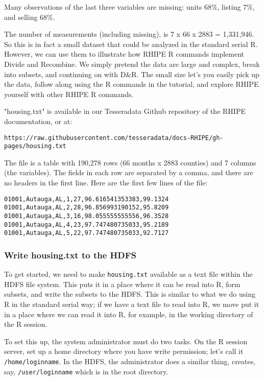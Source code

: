 Many observations of the last three variables are missing: units 68\%, listing
7\%, and selling 68\%.
 
The number of measurements (including missing), is 7 x 66 x 2883 = 1,331,946.
So this is in fact a small dataset that could be analyzed in the standard
serial R. However, we can use them to illustrate how RHIPE R commands implement
Divide and Recombine. We simply pretend the data are large and complex, break
into subsets, and continuing on with D\&R. The small size let's you easily
pick up the data, follow along using the R commands in the tutorial, and
explore RHIPE yourself with other RHIPE R commands.

"housing.txt" is available in our Tesseradata Github repository of the
RHIPE documentation, or at:
\begin{verbatim}
https://raw.githubusercontent.com/tesseradata/docs-RHIPE/gh-pages/housing.txt
\end{verbatim}

The file is a table with 190,278 rows (66 months x 2883 counties) and
7 columns (the variables). The fields in each row are separated by a comma,
and there are no headers in the first line. Here are the first few lines of
the file:

\begin{verbatim}
01001,Autauga,AL,1,27,96.616541353383,99.1324
01001,Autauga,AL,2,28,96.856993190152,95.8209
01001,Autauga,AL,3,16,98.055555555556,96.3528
01001,Autauga,AL,4,23,97.747480735033,95.2189
01001,Autauga,AL,5,22,97.747480735033,92.7127
\end{verbatim}

\subsubsection{Write housing.txt to the HDFS}

To get started, we need to make \texttt{housing.txt} available as a text file within
the HDFS file system. This puts it in a place where it can be read into R, form
subsets, and write the subsets to the HDFS. This is similar to what we do
using R in the standard serial way; if we have a text file to read into R, we
move put it in a place where we can read it into R, for example, in the working
directory of the R session.

To set this up, the system administrator must do two tasks.
On the R session server, set up a home directory where you have write
permission; let's call it \texttt{/home/loginname}.
In the HDFS, the administrator does a similar thing, creates, say,
\texttt{/user/loginname} which is in the root directory.

